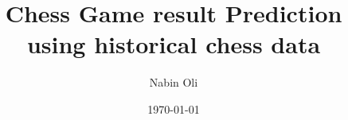 \newcommand{\UniName}{Birmingham City University}
\newcommand{\StudentName}{Nabin Oli}
\newcommand{\StudentID}{23189629}
\newcommand{\DegreeName}{BSc (Hons) Computer and Data Science}

\newcommand{\ModuleCode}{CMP6230}
\newcommand{\TaskName}{Coursework Task 1}
\newcommand{\ReportTitle}{Chess Game result Prediction using historical chess data}
\newcommand{\ReportSubtitle}{%
  \mbox{Lichess Open Database}\ \textperiodcentered\ \mbox{Machine Learning Operation Pipeline}%
}
\newcommand{\ReportType}{Final Individual Report}
\newcommand{\AcademicYear}{Academic Year 2024\,/\,25}
\newcommand{\ModuleTitle}{Data Management and Machine Learning Operations}
\newcommand{\CoordinatorName}{}


\title{\ReportTitle}
\author{\StudentName}
\date{\today}
